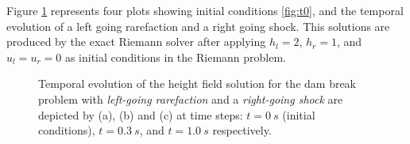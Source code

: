 \documentclass[10pt,a4paper]{article}
\begin{document}
	
	Figure \ref{hor2} represents four plots showing initial conditions \ref{fig:t0}, and the temporal evolution of a left going  rarefaction and a right going shock. This solutions are produced by the exact Riemann solver after applying $h_l = 2$, $h_r = 1$, and $u_l = u_r = 0$ as initial conditions in  the Riemann problem.
	
	\begin{figure}[H]
		\hfill
		\caption{Temporal evolution of the height field solution for the dam break problem with {\em left-going rarefaction} and a {\em right-going shock}  are depicted by (a), (b) and (c) at time steps: $t=0~s$ (initial conditions), $t = 0.3~s$, and $t = 1.0~s$ respectively.  }
		\label{hor2}
	\end{figure}
	
\end{document}
